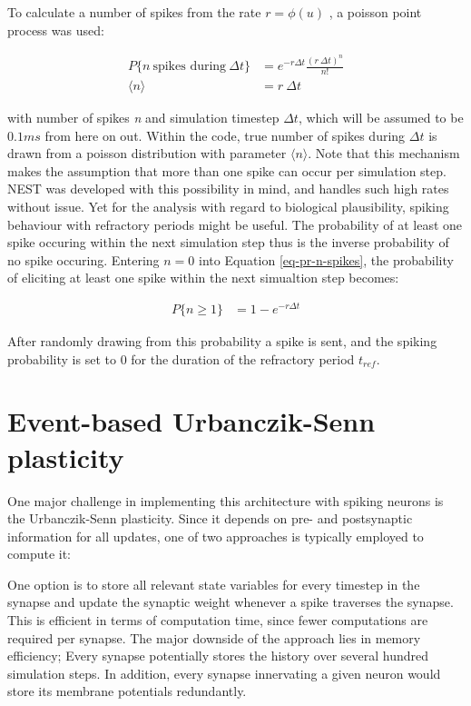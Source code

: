 To calculate a number of spikes from the rate $r = \phi(u)$ , a poisson point process was used:

\begin{align}
  P\{\textit{n} \ \text{spikes during} \ \Delta t\} & = e^{-r \Delta t} \frac{(r \ \Delta t) ^ n}{n!}\label{eq-pr-n-spikes} \\
  \langle \textit{n} \rangle                        & = r \ \Delta t
\end{align}

with number of spikes \textit{n} and simulation timestep $\Delta t$, which will be assumed to be $0.1 ms$ from here on
out. Within the code, true number of spikes during $\Delta t$ is drawn from a poisson distribution with parameter
$\langle n \rangle$. Note that this mechanism makes the assumption that more than one spike can occur per simulation
step. NEST was developed with this possibility in mind, and handles such high rates without issue. Yet for the analysis
with regard to biological plausibility, spiking behaviour with refractory periods might be useful. The probability of at
least one spike occuring within the next simulation step thus is the inverse probability of no spike occuring. Entering
$n=0$ into Equation \ref{eq-pr-n-spikes}, the probability of eliciting at least one spike within the next simualtion
step becomes:

\begin{align}
  P\{ \textit{n} \geq 1\} & = 1 - e^{-r \Delta t}
\end{align}


After randomly drawing from this probability a spike is sent, and the spiking probability is set to 0 for the duration
of the refractory period $t_{ref}$.

\section{Event-based Urbanczik-Senn plasticity}

One major challenge in implementing this architecture with spiking neurons is the Urbanczik-Senn plasticity. Since it
depends on pre- and postsynaptic information for all updates, one of two approaches is typically employed to compute it:

One option is to store all relevant state variables for every timestep in the synapse and update the synaptic weight
whenever a spike traverses the synapse. This is efficient in terms of computation time, since fewer computations are
required per synapse. The major downside of the approach lies in memory efficiency; Every synapse potentially stores the
history over several hundred simulation steps. In addition, every synapse innervating a given neuron would store its
membrane potentials redundantly.

